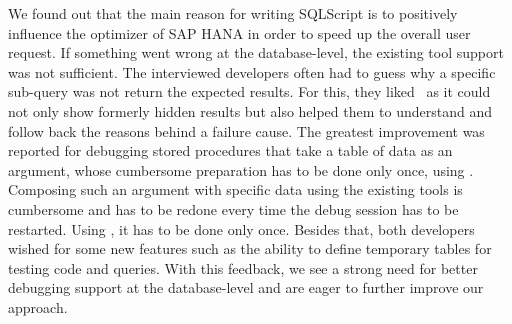 We found out that the main reason for writing SQLScript is to positively influence the optimizer of SAP HANA in order to speed up the overall user request.
If something went wrong at the database-level, the existing tool support was not sufficient. 
The interviewed developers often had to guess why a specific sub-query was not return the expected results. 
For this, they liked \tool\ as it could not only show formerly hidden results but also helped them to understand and follow back the reasons behind a failure cause. 
The greatest improvement was reported for debugging stored procedures that take a table of data as an argument, whose cumbersome preparation has to be done only once, using \tool.
Composing such an argument with specific data using the existing tools is cumbersome and has to be redone every time the debug session has to be restarted.
Using \tool, it has to be done only once.
Besides that, both developers wished for some new features such as the ability to define temporary tables for testing code and queries.
With this feedback, we see a strong need for better debugging support at the database-level and are eager to further improve our approach.


